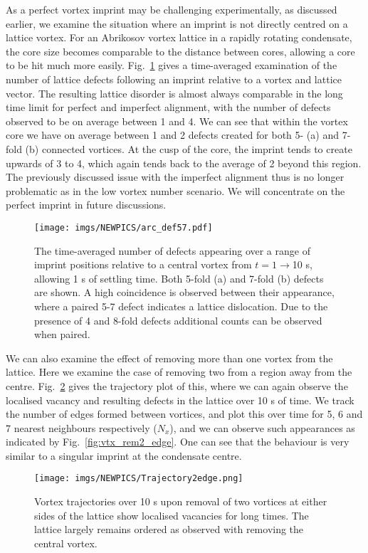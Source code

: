 As a perfect vortex imprint may be challenging experimentally, as discussed earlier, we examine the situation where an imprint is not directly centred on a lattice vortex. For an Abrikosov vortex lattice in a rapidly rotating condensate, the core size becomes comparable to the distance between cores, allowing a core to be hit much more easily. Fig.~\ref{fig:lattice_misalign} gives a time-averaged examination of the number of lattice defects following an imprint relative to a vortex and lattice vector. The resulting lattice disorder is almost always comparable in the long time limit for perfect and imperfect alignment, with the number of defects observed to be on average between 1 and 4.  We can see that within the vortex core we have on average between 1 and 2 defects created for both 5- (a) and 7-fold (b) connected vortices. At the cusp of the core, the imprint tends to create upwards of 3 to 4, which again tends back to the average of 2 beyond this region. The previously discussed issue with the imperfect alignment thus is no longer problematic as in the low vortex number scenario. We will concentrate on the perfect imprint in future discussions.

\begin{figure}[tb]
    \texttt{[image: imgs/NEWPICS/arc\_def57.pdf]}
    \caption{The time-averaged number of defects appearing over a range of imprint positions relative to a central vortex from $t=1\rightarrow$10 s, allowing 1 s of settling time. Both 5-fold (a) and 7-fold (b) defects are shown. A high coincidence is observed between their appearance, where a paired 5-7 defect indicates a lattice dislocation. Due to the presence of 4 and 8-fold defects additional counts can be observed when paired.} \label{fig:lattice_misalign}
\end{figure}

We can also examine the effect of removing more than one vortex from the lattice. Here we examine the case of removing two from a region away from the centre. Fig.~\ref{fig:traj_2vtx_edge} gives the trajectory plot of this, where we can again observe the localised vacancy and resulting defects in the lattice over 10 s of time. We track the number of edges formed between vortices, and plot this over time for 5, 6 and 7 nearest neighbours respectively ($N_x$), and we can observe such appearances as indicated by Fig.~\ref{fig:vtx_rem2_edge}. One can see that the behaviour is very similar to a singular imprint at the condensate centre.

\begin{figure}[tb]
    \texttt{[image: imgs/NEWPICS/Trajectory2edge.png]}
    \caption{Vortex trajectories over 10 s upon removal of two vortices at either sides of the lattice show localised vacancies for long times. The lattice largely remains ordered as observed with removing the central vortex.}\label{fig:traj_2vtx_edge}
\end{figure}

